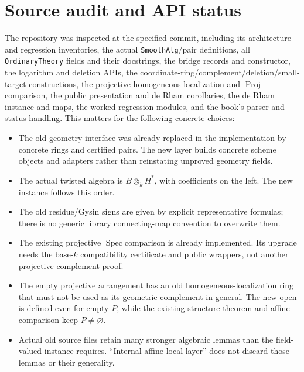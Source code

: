 \documentclass[11pt]{article}
\newcommand{\Spec}{\operatorname{Spec}}
\newcommand{\planned}[1]{\texttt{\detokenize{#1}}}
\theoremstyle{definition}
\theoremstyle{remark}
\renewcommand{\Spec}{\ensuremath{\operatorname{Spec}}}
\newcommand{\Proj}{\ensuremath{\operatorname{Proj}}}
\renewcommand{\planned}[1]{\nolinkurl{#1}}
\begin{document}
\section{Source audit and API status}

The repository was inspected at the specified commit, including its architecture and regression inventories, the actual \planned{SmoothAlg}/pair definitions, all \planned{OrdinaryTheory} fields and their docstrings, the bridge records and constructor, the logarithm and deletion APIs, the coordinate-ring/complement/deletion/small-target constructions, the projective homogeneous-localization and \Proj comparison, the public presentation and de Rham corollaries, the de Rham instance and maps, the worked-regression modules, and the book's parser and status handling. This matters for the following concrete choices:
\begin{itemize}
\item The old geometry interface was already replaced in the implementation by concrete rings and certified pairs. The new layer builds concrete scheme objects and adapters rather than reinstating unproved geometry fields.
\item The actual twisted algebra is $B\otimes_k H^*$, with coefficients on the left. The new instance follows this order.
\item The old residue/Gysin signs are given by explicit representative formulas; there is no generic library connecting-map convention to overwrite them.
\item The existing projective \Spec comparison is already implemented. Its upgrade needs the base-$k$ compatibility certificate and public wrappers, not another projective-complement proof.
\item The empty projective arrangement has an old homogeneous-localization ring that must not be used as its geometric complement in general. The new open is defined even for empty $P$, while the existing structure theorem and affine comparison keep $P\ne\varnothing$.
\item Actual old source files retain many stronger algebraic lemmas than the field-valued instance requires. ``Internal affine-local layer'' does not discard those lemmas or their generality.
\end{itemize}
\end{document}
